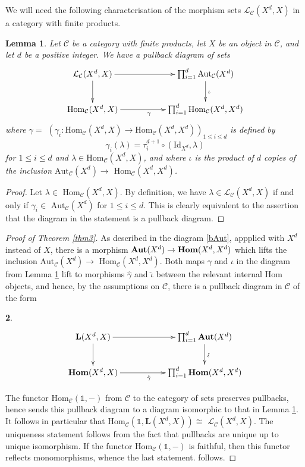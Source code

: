 \documentclass{amsart} %
\theoremstyle{plain}\newtheorem{Theorem}{Theorem}[section]
\theoremstyle{plain}\newtheorem{Conjecture}[Theorem]{Conjecture}
\theoremstyle{plain}\newtheorem{Corollary}[Theorem]{Corollary}
\theoremstyle{plain}\newtheorem{Lemma}[Theorem]{Lemma}
\theoremstyle{plain}\newtheorem{Proposition}[Theorem]{Proposition}
\theoremstyle{definition}\newtheorem{Definition}[Theorem]{Definition}
\theoremstyle{definition}\newtheorem{Example}[Theorem]{Example}
\theoremstyle{definition}\newtheorem{Examples}[Theorem]{Examples}
\theoremstyle{definition}\newtheorem{Remark}[Theorem]{Remark}
\theoremstyle{definition}\newtheorem{Remarks}[Theorem]{Remarks}
\theoremstyle{plain}\newtheorem{Statement}[Theorem]{}
\def\CC{{\mathcal{C}}}    \def\OP{{\mathcal{O}P}}
\def\CL{{\mathcal{L}}}  \def\bCL{{\mathbf{L}}}
\def\One{{\mathds{1}}}
\def\Aut{\mathrm{Aut}}   \def\bAut{\mathbf{Aut}}        \def\tenk{\otimes_k}
\def\Hom{\mathrm{Hom}}           \def\tenkS{\otimes_{kS}}
\def\Id{\mathrm{Id}}             \def\tenA{\otimes_A}
\begin{document}
We will need the following characterisation of the morphism sets $\CL_\CC(X^d,X)$
in a category with finite products.

\begin{Lemma} \label{lem-3}
Let $\CC$ be a category with finite products, let $X$ be an object in $\CC$, and let
$d$ be a positive integer. We have a pullback diagram of sets
$$
\xymatrix{\CL_\CC(X^d,X) \ar[d] \ar[rr] & & \prod_{i=1}^d \Aut_\CC(X^d) \ar[d]^\iota \\
\Hom_\CC(X^d,X) \ar[rr]_\gamma & & \prod_{i=1}^d \Hom_\CC(X^d,X^d) }
$$
where $\gamma=$ 
$(\gamma_i : \Hom_\CC(X^d,X)\to \Hom_\CC(X^d,X^d))_{1\leq i\leq d}$ is defined by 
$$\gamma_i(\lambda)=\tau^{d+1}_i \circ (\Id_{X^d},\lambda)$$
for $1\leq i\leq d$ and $\lambda \in \Hom_\CC(X^d, X)$, and where $\iota$ is
the product of $d$ copies of the inclusion $\Aut_\CC(X^d)\to$ $\Hom_\CC(X^d,X^d)$.
\end{Lemma}

\begin{proof}
Let $\lambda\in$ $\Hom_\CC(X^d,X)$.  By definition, we have
$\lambda\in\CL_\CC(X^d, X)$ if and only if $\gamma_i\in$ $\Aut_\CC(X^d)$ for
$1\leq i\leq d$.  This is clearly equivalent  to the assertion that the diagram in the
statement is a pullback diagram.
\end{proof}


\begin{proof}[Proof of Theorem \ref{thm3}]
As described in the diagram \ref{bAut}, appplied with $X^d$ instead of $X$, there is a morphism 
 $\bAut(X^d) \to \bHom(X^d,X^d)$ which lifts the inclusion $\Aut_\CC(X^d)\to$
$\Hom_\CC(X^d,X^d)$.
Both maps $\gamma$ and $\iota$ in the diagram from Lemma \ref{lem-3}  lift to
morphisms $\hat\gamma$ and $\hat\iota$ between the relevant
 internal Hom objects, and hence, by the assumptions on $\CC$,
 there is a pullback diagram  in $\CC$ of the form
 \begin{Statement} \label{LinternalDef}
 $$\xymatrix{\bCL(X^d,X) \ar[d] \ar[rr] & & \prod_{i=1}^d \bAut(X^d) \ar[d]^{\hat\iota} \\
\bHom(X^d,X) \ar[rr]_{\hat\gamma}  & & \prod_{i=1}^d \bHom(X^d,X^d)}$$
\end{Statement}
The functor $\Hom_\CC(\One,-)$ from $\CC$ to the category of sets preserves
pullbacks, hence sends this pullback diagram to a diagram isomorphic to that in
Lemma \ref{lem-3}. It follows in particular that $\Hom_\CC(\One, \bCL(X^d,X))\cong$ 
$\CL_\CC(X^d,X)$. The uniqueness statement follows from the fact that
 pullbacks are unique up to unique isomorphism. If the functor $\Hom_\CC(\One,-)$ is faithful, then
 this functor reflects monomorphisms, whence the last statement.
follows.
\end{proof}
\end{document}
